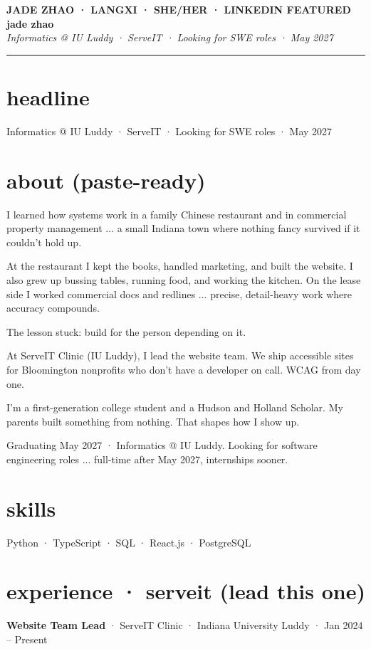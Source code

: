 \documentclass[11pt,letterpaper]{article}
\begin{document}
{\color{jade}\footnotesize\bfseries JADE ZHAO · LANGXI · SHE/HER · LINKEDIN FEATURED}\\[0.4em]
{\color{jade}\LARGE\bfseries jade zhao}\\[0.25em]
{\large\itshape Informatics @ IU Luddy · ServeIT · Looking for SWE roles · May 2027}\\[0.5em]
{\color{jade}\rule{\textwidth}{1.4pt}}

\section*{\color{jade}headline}
Informatics @ IU Luddy · ServeIT · Looking for SWE roles · May 2027

\section*{\color{jade}about (paste-ready)}
I learned how systems work in a family Chinese restaurant and in commercial property management ... a small Indiana town where nothing fancy survived if it couldn't hold up.

At the restaurant I kept the books, handled marketing, and built the website. I also grew up bussing tables, running food, and working the kitchen. On the lease side I worked commercial docs and redlines ... precise, detail-heavy work where accuracy compounds.

The lesson stuck: build for the person depending on it.

At ServeIT Clinic (IU Luddy), I lead the website team. We ship accessible sites for Bloomington nonprofits who don't have a developer on call. WCAG from day one.

I'm a first-generation college student and a Hudson and Holland Scholar. My parents built something from nothing. That shapes how I show up.

Graduating May 2027 · Informatics @ IU Luddy. Looking for software engineering roles ... full-time after May 2027, internships sooner.

\section*{\color{jade}skills}
Python · TypeScript · SQL · React.js · PostgreSQL

\section*{\color{jade}experience · serveit (lead this one)}
\textbf{Website Team Lead} · ServeIT Clinic · Indiana University Luddy · Jan 2024 -- Present
\end{document}
